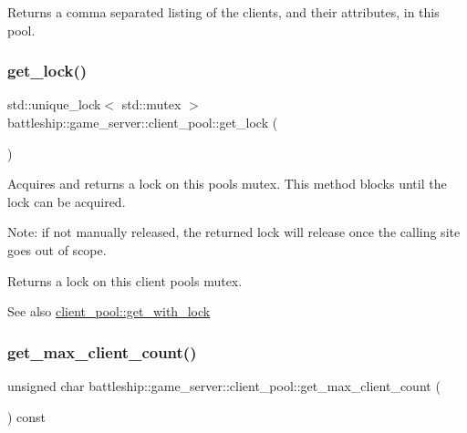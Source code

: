 \begin{DoxyReturn}{Returns}
a comma separated listing of the clients, and their attributes, in this pool. 
\end{DoxyReturn}
\mbox{\label{classbattleship_1_1game__server_1_1client__pool_a6feaf8b0a5c743aa411c2c82be229689}} 
\subsubsection{\texorpdfstring{get\+\_\+lock()}{get\_lock()}}
{\footnotesize\ttfamily std\+::unique\+\_\+lock$<$ std\+::mutex $>$ battleship\+::game\+\_\+server\+::client\+\_\+pool\+::get\+\_\+lock (\begin{DoxyParamCaption}{ }\end{DoxyParamCaption})}

Acquires and returns a lock on this pool\textquotesingle{}s mutex. This method blocks until the lock can be acquired.

Note\+: if not manually released, the returned lock will release once the calling site goes out of scope.

\begin{DoxyReturn}{Returns}
a lock on this client pool\textquotesingle{}s mutex.
\end{DoxyReturn}
\begin{DoxySeeAlso}{See also}
\hyperlink{classbattleship_1_1game__server_1_1client__pool_ab8282d54f2e950f6625508a274dd96d9}{client\+\_\+pool\+::get\+\_\+with\+\_\+lock} 
\end{DoxySeeAlso}
\mbox{\label{classbattleship_1_1game__server_1_1client__pool_aae696f6646de671fd02ff305b728870c}} 
\subsubsection{\texorpdfstring{get\+\_\+max\+\_\+client\+\_\+count()}{get\_max\_client\_count()}}
{\footnotesize\ttfamily unsigned char battleship\+::game\+\_\+server\+::client\+\_\+pool\+::get\+\_\+max\+\_\+client\+\_\+count (\begin{DoxyParamCaption}{ }\end{DoxyParamCaption}) const\hspace{0.3cm}{\ttfamily [inline]}}

